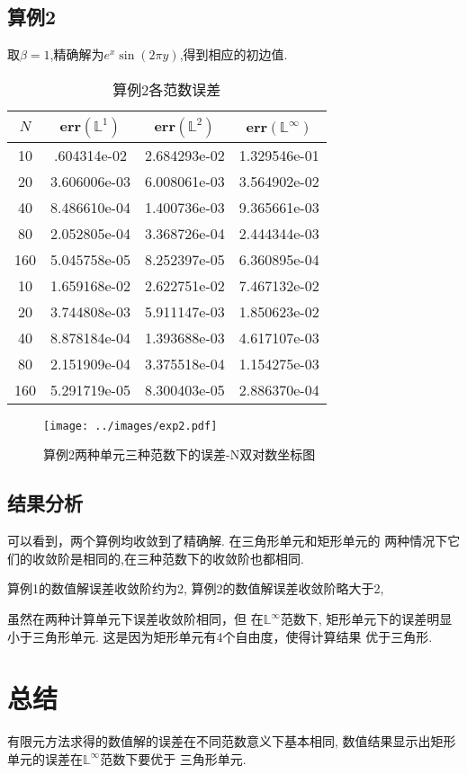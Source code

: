 \documentclass[a4paper, 11pt]{ctexart}
\newcommand\bbL{\mathbb{L}}
\begin{document}
\subsection{算例2}
取$\beta=1$,精确解为$e^x\sin(2\pi y)$,得到相应的初边值.

\begin{table}[H]
	\centering
	\begin{tabular}{c|c|c|c}
		$N$ & err$(\bbL^1)$ & err$(\bbL^2)$ & err$(\bbL^\infty)$ \\ \hline
10 &.604314e-02 &2.684293e-02 &1.329546e-01 \\
20 &3.606006e-03 &6.008061e-03 &3.564902e-02 \\
40 &8.486610e-04 &1.400736e-03 &9.365661e-03 \\
80 &2.052805e-04 &3.368726e-04 &2.444344e-03 \\
160&5.045758e-05 &8.252397e-05 &6.360895e-04 \\
\hline                                   
10 &1.659168e-02 &2.622751e-02 &7.467132e-02 \\
20 &3.744808e-03 &5.911147e-03 &1.850623e-02 \\
40 &8.878184e-04 &1.393688e-03 &4.617107e-03 \\
80 &2.151909e-04 &3.375518e-04 &1.154275e-03 \\
160&5.291719e-05 &8.300403e-05 &2.886370e-04 \\
	\end{tabular}
	\caption{算例2各范数误差}
	\label{tab:2}
\end{table}


\begin{figure}[H]
	\centering
	\texttt{[image: ../images/exp2.pdf]}
	\caption{算例2两种单元三种范数下的误差-N双对数坐标图}
	\label{fig:2}
\end{figure}

\subsection{结果分析}
可以看到，两个算例均收敛到了精确解.
在三角形单元和矩形单元的
两种情况下它们的收敛阶是相同的,在三种范数下的收敛阶也都相同.

算例1的数值解误差收敛阶约为2,
算例2的数值解误差收敛阶略大于2,

虽然在两种计算单元下误差收敛阶相同，但
在$\bbL^\infty$范数下,
矩形单元下的误差明显小于三角形单元.
这是因为矩形单元有4个自由度，使得计算结果
优于三角形.

\section{总结}
有限元方法求得的数值解的误差在不同范数意义下基本相同,
数值结果显示出矩形单元的误差在$\bbL^\infty$范数下要优于
三角形单元.
\end{document}
